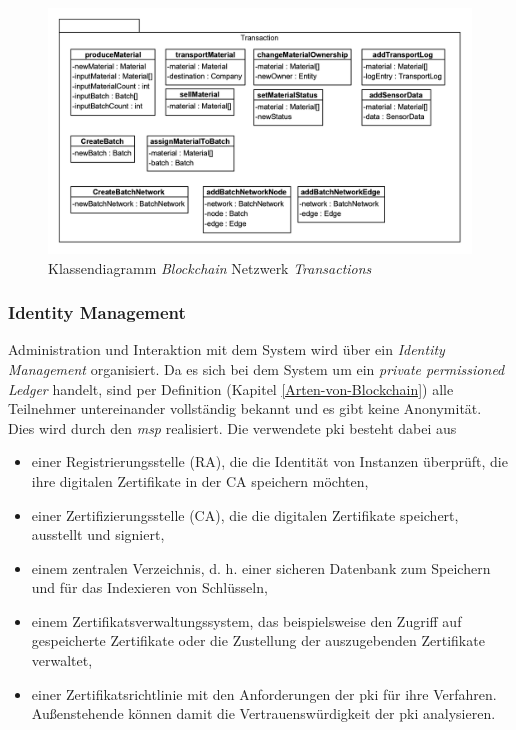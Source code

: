 \begin{figure}[H]
	\centering
	\includegraphics[width=1\linewidth]{pictures/hlc-food-chain-model-transactions}
	\caption[Klassendiagramm \textit{Blockchain} Netzwerk \textit{Transactions}]{Klassendiagramm \textit{Blockchain} Netzwerk \textit{Transactions}}
	\label{fig:hlc-food-chain-model-transactions}
\end{figure}

\subsubsection{Identity Management}
Administration und Interaktion mit dem System wird über ein \textit{Identity Management} organisiert. Da es sich bei dem System um ein \textit{private permissioned Ledger} handelt, sind per Definition (Kapitel \ref{Arten-von-Blockchain}) alle Teilnehmer untereinander vollständig bekannt und es gibt keine Anonymität. Dies wird durch den \textit{\acf{msp}} realisiert. Die verwendete \acf{pki} besteht dabei aus

\begin{itemize}
	\item einer Registrierungsstelle (RA), die die Identität von Instanzen überprüft, die ihre digitalen Zertifikate in der CA speichern möchten,
	\item einer Zertifizierungsstelle (CA), die die digitalen Zertifikate speichert, ausstellt und signiert,
	\item einem zentralen Verzeichnis, d. h. einer sicheren Datenbank zum Speichern und für das Indexieren von Schlüsseln,
	\item einem Zertifikatsverwaltungssystem, das beispielsweise den Zugriff auf gespeicherte Zertifikate oder die Zustellung der auszugebenden Zertifikate verwaltet,
	\item einer Zertifikatsrichtlinie mit den Anforderungen der \ac{pki} für ihre Verfahren. Außenstehende können damit die Vertrauenswürdigkeit der \ac{pki} analysieren.
\end{itemize}

